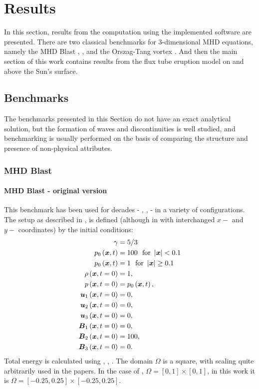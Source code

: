 \chapter{Results}
In this section, results from the computation using the implemented software are presented. There are two classical benchmarks for 3-dimensional MHD equations, namely the MHD Blast \cite{blast1}, \cite{blast2}, and the Orszag-Tang vortex \cite{vortex}. And then the main section of this work contains results from the flux tube eruption model on and above the Sun's surface.

\section{Benchmarks}
The benchmarks presented in this Section do not have an exact analytical solution, but the formation of waves and discontinuities is well studied, and benchmarking is usually performed on the basis of comparing the structure and presence of non-physical attributes.
\subsection{MHD Blast}
\subsubsection{MHD Blast - original version}
This benchmark has been used for decades - \cite{blast0}, \cite{blast1}, \cite{blast2} - in a variety of configurations. The setup as described in \cite{blast0}, \cite{blast1} is defined (although in \cite{blast1} with interchanged $x-$ and $y-$ coordinates) by the initial conditions:
\begin{align}
\label{mhdBlastOld}
\gamma & =  5 / 3\\ \nonumber
p_0\left(\mbox{\boldmath $x$}, t\right) & =  100\ \ \text{for}\ \left|\mbox{\boldmath $x$}\right| < 0.1\\ \nonumber
p_0\left(\mbox{\boldmath $x$}, t\right) & =  1\ \ \text{for}\ \left|\mbox{\boldmath $x$}\right| \geq 0.1\\ \nonumber
\rho\left(\mbox{\boldmath $x$}, t = 0\right) & =  1,\\ \nonumber
p\left(\mbox{\boldmath $x$}, t = 0\right) & =  p_0\left(\mbox{\boldmath $x$}, t\right),\\ \nonumber
\mbox{\boldmath $u$}_1\left(\mbox{\boldmath $x$}, t = 0\right) & =  0,\\ \nonumber
\mbox{\boldmath $u$}_2\left(\mbox{\boldmath $x$}, t = 0\right) & =  0,\\ \nonumber
\mbox{\boldmath $u$}_3\left(\mbox{\boldmath $x$}, t = 0\right) & =  0,\\ \nonumber
\mbox{\boldmath $B$}_1\left(\mbox{\boldmath $x$}, t = 0\right) & =  0,\\ \nonumber
\mbox{\boldmath $B$}_2\left(\mbox{\boldmath $x$}, t = 0\right) & =  100,\\ \nonumber
\mbox{\boldmath $B$}_3\left(\mbox{\boldmath $x$}, t = 0\right) & =  0.
\end{align}
Total energy is calculated using , , .
The domain $\Omega$ is a square, with scaling quite arbitrarily used in the papers. In the case of \cite{blast1}, $\Omega = [0, 1] \times [0, 1]$, in this work it is $\Omega = [-0.25, 0.25] \times [-0.25, 0.25]$.

